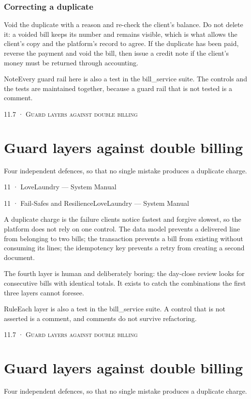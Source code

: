 \documentclass[11pt,a4paper,oneside]{book}
\begin{document}
\subsubsection*{Correcting a duplicate}
Void the duplicate with a reason and re-check the client's balance. Do not delete it: a voided bill keeps its number and remains visible, which is what allows the client's copy and the platform's record to agree. If the duplicate has been paid, reverse the payment and void the bill, then issue a credit note if the client's money must be returned through accounting.

\begin{notebox}NoteEvery guard rail here is also a test in the bill\_service suite. The controls and the tests are maintained together, because a guard rail that is not tested is a comment.\end{notebox}
\textsc{\small\color{crimson}11.7 · Guard layers against double billing}\par\medskip
\section*{Guard layers against double billing}
Four independent defences, so that no single mistake produces a duplicate charge.

11 · LoveLaundry — System Manual

11 · Fail-Safes and ResilienceLoveLaundry — System Manual

A duplicate charge is the failure clients notice fastest and forgive slowest, so the platform does not rely on one control. The data model prevents a delivered line from belonging to two bills; the transaction prevents a bill from existing without consuming its lines; the idempotency key prevents a retry from creating a second document.

The fourth layer is human and deliberately boring: the day-close review looks for consecutive bills with identical totals. It exists to catch the combinations the first three layers cannot foresee.

\begin{notebox}RuleEach layer is also a test in the bill\_service suite. A control that is not asserted is a comment, and comments do not survive refactoring.\end{notebox}
\textsc{\small\color{crimson}11.7 · Guard layers against double billing}\par\medskip
\section*{Guard layers against double billing}
Four independent defences, so that no single mistake produces a duplicate charge.
\end{document}
